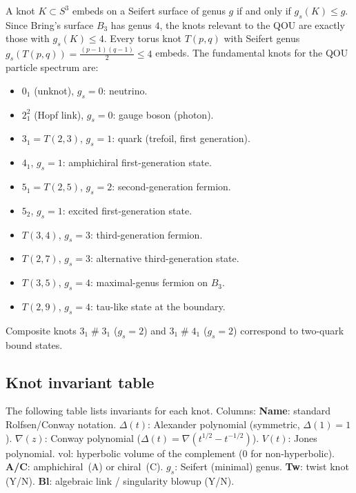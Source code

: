 \begin{remark}
\label{rem:knots-embeddable}
A knot $K \subset S^3$ embeds on a Seifert surface of genus $g$ if and
only if $g_s(K) \le g$.  Since Bring's surface $B_3$ has genus $4$, the
knots relevant to the QOU are exactly those with $g_s(K) \le 4$.  Every
torus knot $T(p,q)$ with Seifert genus
$g_s(T(p,q)) = \tfrac{(p-1)(q-1)}{2} \le 4$ embeds.  The fundamental
knots for the QOU particle spectrum are:
\begin{itemize}
  \item $0_1$ (unknot), $g_s=0$: neutrino.
  \item $2^2_1$ (Hopf link), $g_s=0$: gauge boson (photon).
  \item $3_1 = T(2,3)$, $g_s=1$: quark (trefoil, first generation).
  \item $4_1$, $g_s=1$: amphichiral first-generation state.
  \item $5_1 = T(2,5)$, $g_s=2$: second-generation fermion.
  \item $5_2$, $g_s=1$: excited first-generation state.
  \item $T(3,4)$, $g_s=3$: third-generation fermion.
  \item $T(2,7)$, $g_s=3$: alternative third-generation state.
  \item $T(3,5)$, $g_s=4$: maximal-genus fermion on $B_3$.
  \item $T(2,9)$, $g_s=4$: tau-like state at the boundary.
\end{itemize}
Composite knots $3_1 \mathbin{\#} 3_1$ ($g_s=2$) and
$3_1 \mathbin{\#} 4_1$ ($g_s=2$) correspond to two-quark bound
states.
\end{remark}

\subsection{Knot invariant table}
\label{subsec:knot-invariant-table}

The following table lists invariants for each knot.  Columns:
\textbf{Name}: standard Rolfsen/Conway notation.
\textbf{$\Delta(t)$}: Alexander polynomial (symmetric, $\Delta(1)=1$).
\textbf{$\nabla(z)$}: Conway polynomial ($\Delta(t)=\nabla(t^{1/2}-t^{-1/2})$).
\textbf{$V(t)$}: Jones polynomial.
\textbf{$\mathrm{vol}$}: hyperbolic volume of the complement ($0$ for
non-hyperbolic).
\textbf{A/C}: amphichiral~(A) or chiral~(C).
\textbf{$g_s$}: Seifert (minimal) genus.
\textbf{Tw}: twist knot (Y/N).
\textbf{Bl}: algebraic link / singularity blowup (Y/N).

